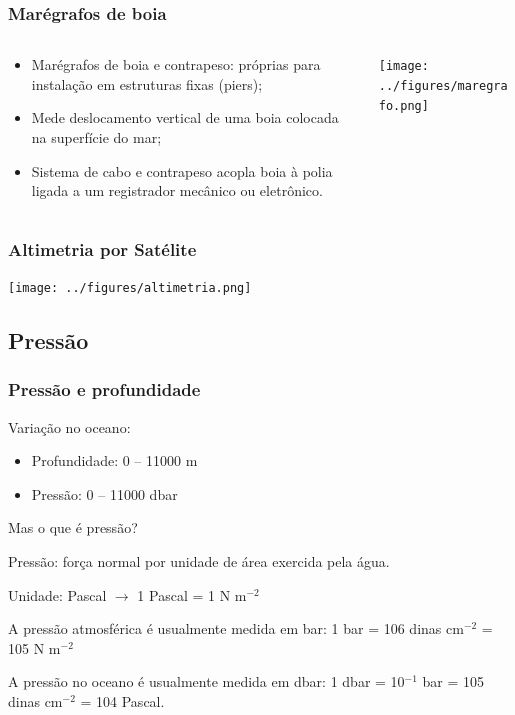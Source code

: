 \begin{frame}
\frametitle{Marégrafos de boia}
    \begin{columns}
        \begin{column}{0.5\textwidth}
        \small{
        \begin{itemize}[<+-| alert@+>]
            \item Marégrafos de boia e contrapeso: próprias para instalação em
                  estruturas fixas (piers);
            \item Mede deslocamento vertical de uma boia colocada na superfície
                  do mar;
            \item Sistema de cabo e contrapeso acopla boia à polia ligada a
                  um registrador mecânico ou eletrônico.
        \end{itemize}
        }
        \end{column}
    \begin{column}{0.5\textwidth}
    \begin{center}
        \texttt{[image: ../figures/maregrafo.png]}
    \end{center}
    \end{column}
    \end{columns}
\end{frame}

\begin{frame}
\frametitle{Altimetria por Satélite}
    \begin{center}
       \texttt{[image: ../figures/altimetria.png]}
    \end{center}
\end{frame}

\subsection{Pressão}
\begin{frame}
\frametitle{Pressão e profundidade}
Variação no oceano:
    \small{
    \begin{itemize}[<+-| alert@+>]
    \item Profundidade: 0 -- 11000 m
    \item Pressão: 0 -- 11000 dbar
    \end{itemize}
    }
    \pause
    Mas o que é pressão?
    \pause
    \begin{block}{}
        Pressão: força normal por unidade de área exercida pela água.

        Unidade: Pascal $\rightarrow$ 1 Pascal = 1 N m$^{-2}$
    \end{block}

    \begin{block}{}
        A pressão atmosférica é usualmente medida em bar:
        1 bar = 106 dinas cm$^{-2}$ = 105 N m$^{-2}$

        A pressão no oceano é usualmente medida em dbar:
        1 dbar = 10$^{-1}$ bar = 105 dinas cm$^{-2}$ = 104 Pascal.
    \end{block}
\end{frame}

